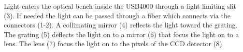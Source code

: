 Light enters the optical bench inside the USB4000 through a light limiting slit (3). If needed the light can be passed through a fiber which connects via the connectors (1-2). A collimating  mirror (4) reflects the light toward the grating. The grating (5) deflects the light on  to a mirror (6) that focus the light on to a lens. The lens (7) focus the light on to the pixels of the CCD detector (8).




















